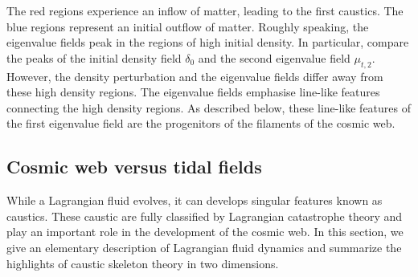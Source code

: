 \documentclass[a4paper, 11pt]{article}
\begin{document}
\begin{framed}
The red regions experience an inflow of matter, leading to the first
caustics. The blue regions represent an initial outflow of matter.
Roughly speaking, the eigenvalue fields peak in the regions of high
initial density. In particular, compare the peaks of the initial density
field $\delta_0$ and the second eigenvalue field $\mu_{t,2}$. However,
the density perturbation and the eigenvalue fields differ away from
these high density regions. The eigenvalue fields emphasise line-like
features connecting the high density regions. As described below, these
line-like features of the first eigenvalue field are the progenitors of
the filaments of the cosmic web.
\end{framed}
\subsection{Cosmic web versus tidal fields}
While a Lagrangian fluid evolves, it can develops singular features
known as caustics. These caustic are fully classified by Lagrangian
catastrophe theory and play an important role in the development of the
cosmic web. In this section, we give an elementary description of
Lagrangian fluid dynamics and summarize the highlights of caustic
skeleton theory in two dimensions.
\end{document}

